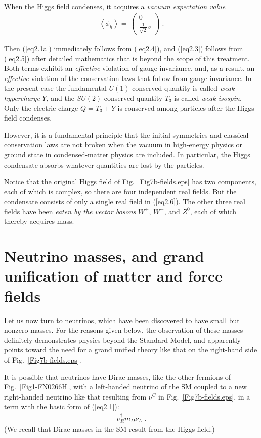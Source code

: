 \documentclass[12pt]{iopart}
\begin{document}
When the Higgs field condenses, it acquires a \textit{vacuum expectation value} 
\begin{eqnarray}
\left\langle \phi _{h}\right\rangle =\,\left( 
\begin{array}{c}
0 \\ 
\frac{1}{\sqrt{2}}v
\end{array}
\right) 
\label{eq2.6} \; .
\end{eqnarray}

Then (\ref{eq2.1a}) immediately follows from (\ref{eq2.4}), and (\ref{eq2.3}) follows from (\ref{eq2.5}) after detailed mathematics that is beyond the scope of this treatment. Both terms exhibit an \textit{effective} violation of gauge invariance, and, as a result, an \textit{effective} violation of the conservation laws that follow from gauge invariance. In the present case the fundamental $U(1)$ conserved quantity is called \textit{weak hypercharge} $Y$, and the $SU(2)$ conserved quantity $T_3$ is called \textit{weak isospin}. Only the electric charge $Q=T_3 + Y$ is conserved among particles after the Higgs field condenses. 

However, it is a fundamental principle that the initial symmetries and classical conservation laws are not broken when the vacuum in high-energy physics or ground state in condensed-matter physics are included. In particular, the Higgs condensate absorbs whatever quantities are lost by the particles. 

Notice that the original Higgs field of Fig.~\ref{Fig7b-fields.eps} has two components, each of which is complex, so there are four independent real fields. But the condensate consists of only a single real field in (\ref{eq2.6}). The other three real fields have been \textit{eaten by the vector bosons} $W^+$, $W^-$, and $Z^0$, each of which thereby acquires mass.  

\section{\label{sec:sec3} Neutrino masses, and grand unification of matter and force fields}

Let us now turn to neutrinos, which have been discovered to have small but nonzero masses. For the reasons given below, the observation of these masses definitely demonstrates physics beyond the Standard Model, and apparently points toward the need for a grand unified theory like that on the right-hand side of Fig.~\ref{Fig7b-fields.eps}. 

It is possible that neutrinos have Dirac masses, like the other fermions of Fig.~\ref{Fig1-FN0266H}, with a left-handed neutrino of the SM coupled to a new right-handed neutrino like that resulting from $\nu ^{C}$ in Fig.~\ref{Fig7b-fields.eps}, in a term with the basic form of (\ref{eq2.1}):
\begin{eqnarray}
\nu_R^{\dag} m_D \nu_L \; .
\label{eq1.2}
\end{eqnarray}
(We recall that Dirac masses in the SM result from the Higgs field.)
\end{document}
